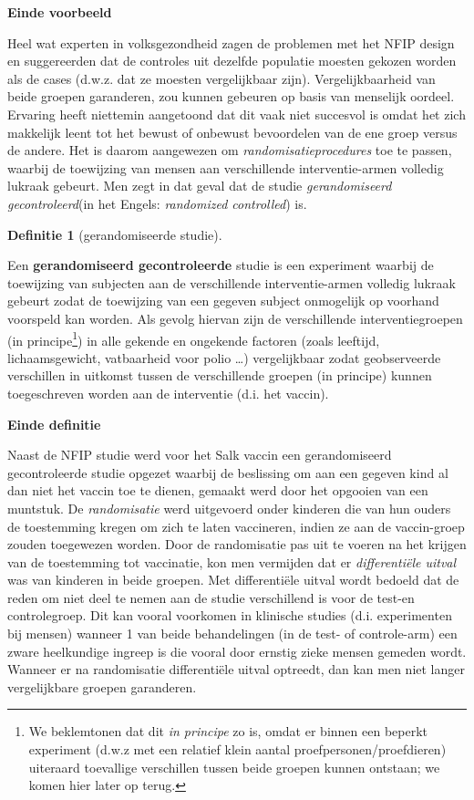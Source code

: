 \documentclass[
  12pt,dutch,coursenotes]{book}
\theoremstyle{definition}
\newtheorem{definition}{Definitie}[chapter]
\theoremstyle{definition}
\theoremstyle{definition}
\theoremstyle{definition}
\theoremstyle{remark}
\begin{document}
\textbf{Einde voorbeeld}

Heel wat experten in volksgezondheid zagen de problemen met het NFIP design
en suggereerden dat de controles uit dezelfde populatie moesten gekozen
worden als de cases (d.w.z. dat ze moesten vergelijkbaar zijn).
Vergelijkbaarheid van beide groepen garanderen, zou kunnen gebeuren op basis
van menselijk oordeel. Ervaring heeft niettemin aangetoond dat dit vaak niet
succesvol is omdat het zich makkelijk leent tot het bewust of onbewust
bevoordelen van de ene groep versus de andere. Het is daarom aangewezen om
\emph{randomisatieprocedures} toe te passen, waarbij de toewijzing van
mensen aan verschillende interventie-armen volledig lukraak gebeurt. Men
zegt in dat geval dat de studie \emph{gerandomiseerd gecontroleerd}(in
het Engels: \emph{randomized controlled}) is.

\begin{definition}[gerandomiseerde studie]
\protect\hypertarget{def:unnamed-chunk-69}{}{\label{def:unnamed-chunk-69} {} }
\end{definition}
Een \textbf{gerandomiseerd gecontroleerde} studie is een experiment waarbij
de toewijzing van subjecten aan de verschillende interventie-armen volledig
lukraak gebeurt zodat de toewijzing van een gegeven subject onmogelijk op
voorhand voorspeld kan worden. Als gevolg hiervan zijn de verschillende
interventiegroepen (in principe\footnote{We beklemtonen dat dit \emph{in principe} zo is, omdat er binnen een beperkt experiment (d.w.z met een relatief klein aantal proefpersonen/proefdieren) uiteraard toevallige verschillen tussen beide groepen kunnen ontstaan; we komen hier later op terug.}) in alle gekende en ongekende factoren (zoals
leeftijd, lichaamsgewicht, vatbaarheid voor polio \ldots) vergelijkbaar zodat
geobserveerde verschillen in uitkomst tussen de verschillende groepen (in
principe) kunnen toegeschreven worden aan de interventie (d.i. het vaccin).

\textbf{Einde definitie}

Naast de NFIP studie werd voor het Salk vaccin een gerandomiseerd
gecontroleerde studie opgezet waarbij de beslissing om aan een gegeven kind
al dan niet het vaccin toe te dienen, gemaakt werd door het opgooien van een
muntstuk. De \emph{randomisatie} werd uitgevoerd onder kinderen die van
hun ouders de toestemming kregen om zich te laten vaccineren, indien ze aan de
vaccin-groep zouden toegewezen worden. Door de randomisatie pas uit te
voeren na het krijgen van de toestemming tot vaccinatie, kon men vermijden
dat er \emph{differentiële uitval} was van kinderen in beide
groepen. Met differentiële uitval wordt bedoeld dat de reden om niet
deel te nemen aan de studie verschillend is voor de test-en controlegroep.
Dit kan vooral voorkomen in klinische studies (d.i. experimenten bij mensen)
wanneer 1 van beide behandelingen (in de test- of
controle-arm) een zware heelkundige ingreep is die vooral door ernstig zieke
mensen gemeden wordt. Wanneer er na randomisatie differentiële uitval
optreedt, dan kan men niet langer vergelijkbare groepen garanderen.
\end{document}
